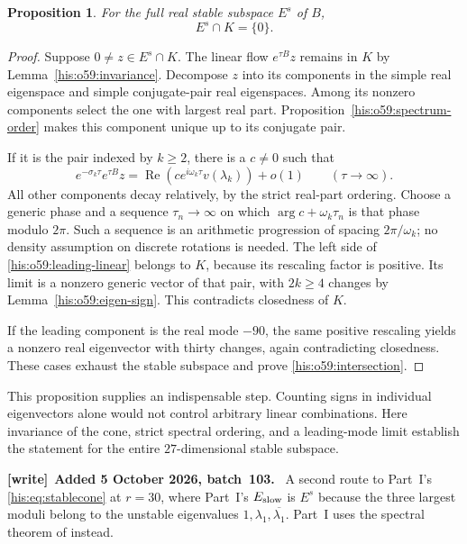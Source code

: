 \documentclass[11pt]{article}
\newtheorem{proposition}[theorem]{Proposition}
\theoremstyle{remark}\newtheorem{remark}[theorem]{Remark}
\DeclareMathOperator{\Rea}{Re}
\numberwithin{equation}{section}
\newenvironment{writenote}[1][]{\par\smallskip\begingroup\small
 \noindent\textbf{[write]}\if\relax\detokenize{#1}\relax\else~\textbf{#1.}\fi\ }%
 {\par\endgroup\smallskip}
\begin{document}
\begin{proposition}\label{his:o59:stable-exclusion}
For the full real stable subspace $E^s$ of $B$,
\begin{equation}\label{his:o59:intersection}
E^s\cap K=\{0\}.
\end{equation}
\end{proposition}
\begin{proof}
Suppose $0\ne z\in E^s\cap K$. The linear flow $e^{\tau B}z$
remains in $K$ by Lemma~\ref{his:o59:invariance}. Decompose $z$ into its
components in the simple real eigenspace and simple conjugate-pair
real eigenspaces. Among its nonzero components select the one with
largest real part. Proposition~\ref{his:o59:spectrum-order} makes this
component unique up to its conjugate pair.

If it is the pair indexed by $k\ge2$, there is a $c\ne0$ such that
\begin{equation}\label{his:o59:leading-linear}
e^{-\sigma_k\tau}e^{\tau B}z
=\Rea\!\left(c e^{i\omega_k\tau}v(\lambda_k)\right)+o(1)
\qquad(\tau\to\infty).
\end{equation}
All other components decay relatively, by the strict real-part
ordering. Choose a generic phase and a sequence $\tau_n\to\infty$
on which $\arg c+\omega_k\tau_n$ is that phase modulo $2\pi$.
Such a sequence is an arithmetic progression of spacing
$2\pi/\omega_k$; no density assumption on discrete rotations is needed.
The left side of \eqref{his:o59:leading-linear} belongs to $K$, because its
rescaling factor is positive. Its limit is a nonzero generic vector
of that pair, with $2k\ge4$ changes by Lemma~\ref{his:o59:eigen-sign}.
This contradicts closedness of $K$.

If the leading component is the real mode $-90$, the same positive
rescaling yields a nonzero real eigenvector with thirty changes,
again contradicting closedness. These cases exhaust the stable
subspace and prove \eqref{his:o59:intersection}.
\end{proof}
This proposition supplies an indispensable step. Counting signs in
individual eigenvectors alone would not control arbitrary linear
combinations. Here invariance of the cone, strict spectral ordering,
and a leading-mode limit establish the statement for the entire
$27$-dimensional stable subspace.
\begin{writenote}[Added 5 October 2026, batch~103]
A second route to Part~I's \eqref{his:eq:stablecone} at $r=30$, where Part~I's $E_{\rm slow}$ is $E^s$ because the three largest moduli belong to the unstable eigenvalues $1,\lambda_1,\overline{\lambda_1}$. Part~I uses the spectral theorem of \cite{alseidi2019} instead.
\end{writenote}
\end{document}
